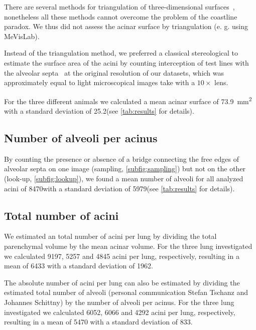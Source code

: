 \documentclass[a4paper,DIV=calc,abstract,english]{scrartcl}
\newcommand{\totalnumberofaciniB}{9197}
\newcommand{\totalnumberofaciniD}{5257}
\newcommand{\totalnumberofaciniE}{4845}
\newcommand{\meantotalnumberofacini}{6433}
\newcommand{\meantotalnumberofaciniSTD}{1962} %
\newcommand{\totalnumberofaciniBVariant}{6052}
\newcommand{\totalnumberofaciniDVariant}{6066}
\newcommand{\totalnumberofaciniEVariant}{4292}
\newcommand{\meantotalnumberofaciniVariant}{5470}
\newcommand{\meantotalnumberofaciniSTDVariant}{833} %
\newcommand{\meannumberofalveoli}{8470} %
\newcommand{\meannumberofalveoliSTD}{5979}
\newcommand{\meanacinarsurface}{73.9} %
\newcommand{\meanacinarsurfaceSTD}{25.2}
\begin{document}
There are several methods for triangulation of three-dimensional surfaces~\citep{Lorensen1987,Schneiders1996}, nonetheless all these methods cannot overcome the problem of the coastline paradox. We thus  did not assess the acinar surface by triangulation (e. g. using MeVisLab).

Instead of the triangulation method, we preferred a classical stereological to estimate the surface area of the acini by counting interception of test lines with the alveolar septa~\citep{Hsia2010} at the original resolution of our datasets, which was approximately equal to light microscopical images take with a \(10\times\) lens.

For the three different animals we calculated a mean acinar surface of \SI{\meanacinarsurface}{\milli\meter\squared} with a standard deviation of \meanacinarsurfaceSTD (see \autoref{tab:results} for details).

\subsection{Number of alveoli per acinus}
By counting the presence or absence of a bridge connecting the free edges of alveolar septa on one image (sampling, \autoref{subfig:sampling}) but not on the other (look-up, \autoref{subfig:lookup}), we found a mean number of alveoli for all analyzed acini of \meannumberofalveoli with a standard deviation of \meannumberofalveoliSTD (see \autoref{tab:results} for details).

\subsection{Total number of acini}\label{sec:results:total number of acini}
We estimated an total number of acini per lung by dividing the total parenchymal volume by the mean acinar volume.
For the three lung investigated we calculated \totalnumberofaciniB, \totalnumberofaciniD\xspace and \totalnumberofaciniE\xspace acini per lung, respectively, resulting in a mean of \meantotalnumberofacini\xspace with a standard deviation of \meantotalnumberofaciniSTD.

The absolute number of acini per lung can also be estimated by dividing the estimated total number of alveoli (personal communication Stefan Tschanz and Johannes Schittny) by the number of alveoli per acinus.
For the three lung investigated we calculated \totalnumberofaciniBVariant, \totalnumberofaciniDVariant\xspace and \totalnumberofaciniEVariant\xspace acini per lung, respectively, resulting in a mean of \meantotalnumberofaciniVariant\xspace with a standard deviation of \meantotalnumberofaciniSTDVariant.
\end{document}
